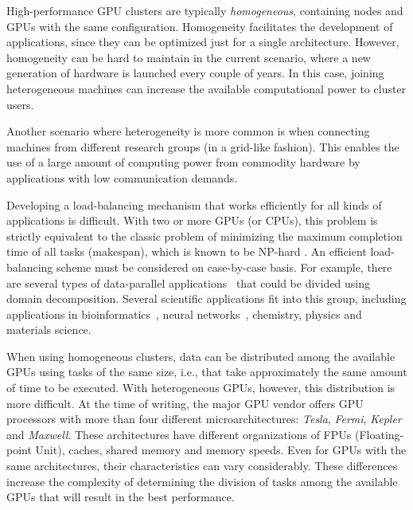 \documentclass[journal]{IEEEtran}
\begin{document}
High-performance GPU clusters are typically \emph{homogeneous}, containing nodes
and GPUs with the same configuration. Homogeneity facilitates the development of
applications, since they can be optimized just for a single
architecture. %
However, homogeneity can be hard to maintain in the current scenario,
where a new generation of hardware is launched every couple of years. In
this case, joining heterogeneous machines can increase the available
computational power to cluster users.

Another scenario where heterogeneity is more common is when connecting machines
from different research groups (in a grid-like fashion). This enables the use of
a large amount of computing power from commodity hardware 
by applications with low communication demands.%

Developing a load-balancing mechanism that works efficiently for all kinds of
applications is difficult. With two or more GPUs (or CPUs), this problem is
strictly equivalent to the classic problem of minimizing the maximum completion
time of all tasks (makespan), which is known to be NP-hard \cite{GaJo1979}. An
efficient load-balancing scheme must be considered on case-by-case basis. For
example, there are several types of data-parallel
applications~\cite{Gropp:1992uq} that could be divided using domain
decomposition. Several scientific applications fit into this group, including
applications in bioinformatics~\cite{bioinformatica2}, neural
networks~\cite{neural}, chemistry, physics and materials science.

When using homogeneous clusters, data can be distributed among the available
GPUs using tasks of the same size, i.e., that take approximately the same amount of time to be executed. With heterogeneous GPUs, however, this
distribution is more difficult. At the time of writing, the major GPU vendor offers GPU processors with more than four different microarchitectures: \emph{Tesla},​ \emph{Fermi}, \emph{Kepler} and \emph{Maxwell}. These
architectures have different organizations of FPUs (Floating-point Unit),
caches, shared memory and memory speeds. Even for GPUs with the same
architectures, their characteristics can vary considerably. These differences increase the complexity of determining the division of tasks among the available GPUs that will result in the best performance.
\end{document}
